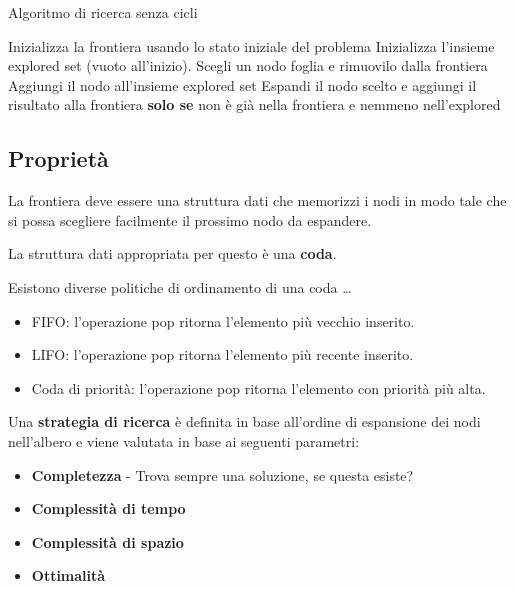 \begin{algorithm}
    \caption{Algoritmo di ricerca senza cicli}
    \label{alg:search2}
    \begin{algorithmic}[1] %
         
			\State Inizializza la frontiera usando lo stato iniziale del problema
			\State Inizializza l'insieme explored set (vuoto all'inizio).
            \Loop
              \EndIf
            \State Scegli un nodo foglia e rimuovilo dalla frontiera
              \EndIf
			\State Aggiungi il nodo all'insieme explored set
            \State Espandi il nodo scelto e aggiungi il risultato alla
frontiera \textbf{solo se} non è già nella frontiera e nemmeno nell'explored 
			\EndLoop
        \EndProcedure
    \end{algorithmic}
\end{algorithm}

\subsection{Proprietà}

La frontiera deve essere una struttura dati che memorizzi i nodi in modo tale
che si possa scegliere facilmente il prossimo nodo da espandere.

La struttura dati appropriata per questo è una \textbf{coda}.

Esistono diverse politiche di ordinamento di una coda \dots

\begin{itemize}
\item FIFO: l'operazione pop ritorna l'elemento più vecchio inserito.
\item LIFO: l'operazione pop ritorna l'elemento più recente inserito.
\item Coda di priorità: l'operazione pop ritorna l'elemento con priorità più alta.
\end{itemize}

Una \textbf{strategia di ricerca} è definita in base all'ordine di espansione
dei nodi nell'albero e viene valutata in base ai seguenti parametri:

\begin{itemize}
\item \textbf{Completezza} - Trova sempre una soluzione, se questa esiste?
\item \textbf{Complessità di tempo}
\item \textbf{Complessità di spazio}
\item \textbf{Ottimalità}
\end{itemize}

